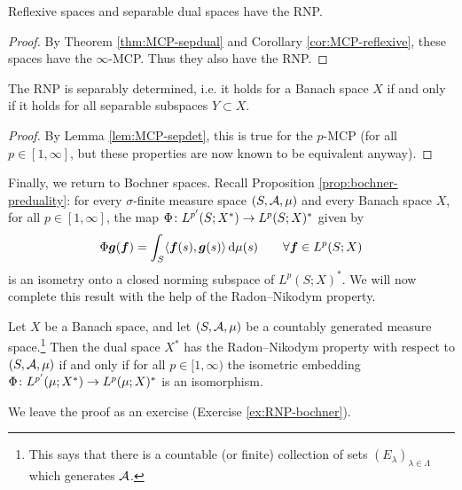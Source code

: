 \begin{cor}
  Reflexive spaces and separable dual spaces have the RNP.
\end{cor}

\begin{proof}
  By Theorem \ref{thm:MCP-sepdual} and Corollary \ref{cor:MCP-reflexive}, these spaces have the $\infty$-MCP.
  Thus they also have the RNP.
\end{proof}

\begin{cor}
  The RNP is separably determined, i.e. it holds for a Banach space $X$ if and only if it holds for all separable subspaces $Y \subset X$.
\end{cor}

\begin{proof}
  By Lemma \ref{lem:MCP-sepdet}, this is true for the $p$-MCP (for all $p \in [1,\infty]$, but these properties are now known to be equivalent anyway). 
\end{proof}

Finally, we return to Bochner spaces.
Recall Proposition \ref{prop:bochner-preduality}: for every $\sigma$-finite measure space $(S,\mathcal{A},\mu)$ and every Banach space $X$, for all $p \in [1,\infty]$, the map $\Phi \colon L^{p'}(S;X^*) \rightarrow L^p(S;X)^*$ given by
\begin{equation*}
  \Phi \bm{g}(\bm{f}) = \int_{S} \langle \bm{f}(s), \bm{g}(s) \rangle \, \mathrm{d}\mu(s) \qquad \forall \bm{f} \in L^p(S;X)
\end{equation*}
is an isometry onto a closed norming subspace of $L^p(S;X)^*$.
We will now complete this result with the help of the Radon--Nikodym property.

\begin{thm}\label{thm:bochner-duality-RNP}
  Let $X$ be a Banach space, and let $(S,\mathcal{A},\mu)$ be a countably generated measure space.\footnote{This says that there is a countable (or finite) collection of sets $(E_{\lambda})_{\lambda \in \Lambda}$ which generates $\mathcal{A}$.}
  Then the dual space $X^*$ has the Radon--Nikodym property with respect to $(S,\mathcal{A},\mu)$ if and only if for all $p \in [1,\infty)$ the isometric embedding $\Phi \colon L^{p'}(\mu;X^*) \rightarrow L^p(\mu;X)^*$ is an isomorphism.
\end{thm}

We leave the proof as an exercise (Exercise \ref{ex:RNP-bochner}). 

